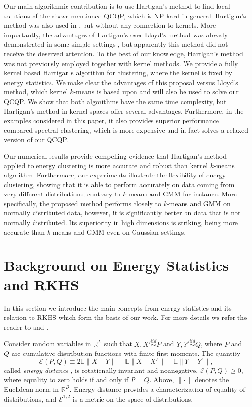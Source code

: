 \documentclass[aps,preprint,nofootinbib,floatfix]{revtex4-1}
\newcommand\Energy{\mathcal{E}}
\newcommand\E{\mathbb{E}}
\begin{document}
Our main 
algorithmic contribution is to use Hartigan's method \cite{Hartigan} to 
find local solutions of the above mentioned QCQP, which is NP-hard in general.
Hartigan's method was also used in \cite{Kgroups}, but without
any connection to kernels. More importantly, the
advantages
of Hartigan's over Lloyd's method was already demonstrated 
in some simple settings
\cite{Telgarsky,Slonin}, but apparently this method did not receive 
the deserved attention. To the 
best of our knowledge, Hartigan's method was not previously 
employed together with kernel methods. 
We provide a fully kernel based Hartigan's algorithm for clustering,
where the kernel is fixed by energy statistics. 
We make clear the advantages of this proposal versus 
Lloyd's method, which kernel $k$-means is based upon and will also be used 
to solve our QCQP. We show that both algorithms  have the same
time complexity, but Hartigan's method in kernel spaces offer several
advantages. Furthermore, in the examples considered in this paper, it 
also provides superior performance compared spectral clustering, which
is more expensive and in fact solves a relaxed version of our QCQP.

Our numerical results provide compelling evidence that 
Hartigan's method applied to energy clustering 
is more accurate and robust than kernel $k$-means algorithm.
Furthermore, our experiments illustrate 
the flexibility of energy clustering, 
showing that it is able to perform accurately on data coming from 
very different distributions, contrary to $k$-means and GMM for instance.
More specifically, the proposed method performs 
closely to $k$-means and GMM on normally distributed data, however,
it is significantly better on data that 
is not normally distributed. 
Its superiority in high dimensions
is striking, being more accurate than $k$-means and GMM 
even on Gaussian settings. 


\section{Background on Energy Statistics and RKHS}
\label{sec:background}

In this section we introduce the main concepts from energy
statistics and its relation to 
RKHS which form the basis of our work.
For more details we refer the reader
to \cite{Szkely2013} and \cite{Sejdinovic2013}.

Consider random variables in $\mathbb{R}^D$ 
such that $X,X' \stackrel{iid}{\sim} P$ and 
$Y,Y' \stackrel{iid}{\sim} Q$, where $P$ and $Q$ are cumulative
distribution functions with finite first moments. 
The quantity 
\begin{equation}
\label{eq:energy}
\Energy(P, Q) \equiv 2 \E \| X - Y\| - \E \| X - X' \| - \E \| Y - Y' \|,
\end{equation}
called \emph{energy distance} \cite{Szkely2013}, 
is rotationally invariant and nonnegative, $\Energy(P,Q) \ge 0$, where
equality
to zero holds if and only if $P = Q$.
Above, $\| \cdot \|$ denotes the
Euclidean norm in $\mathbb{R}^D$. 
Energy distance
provides a characterization of equality of distributions, and
$\Energy^{1/2}$ is
a metric on the space of distributions.
\end{document}
